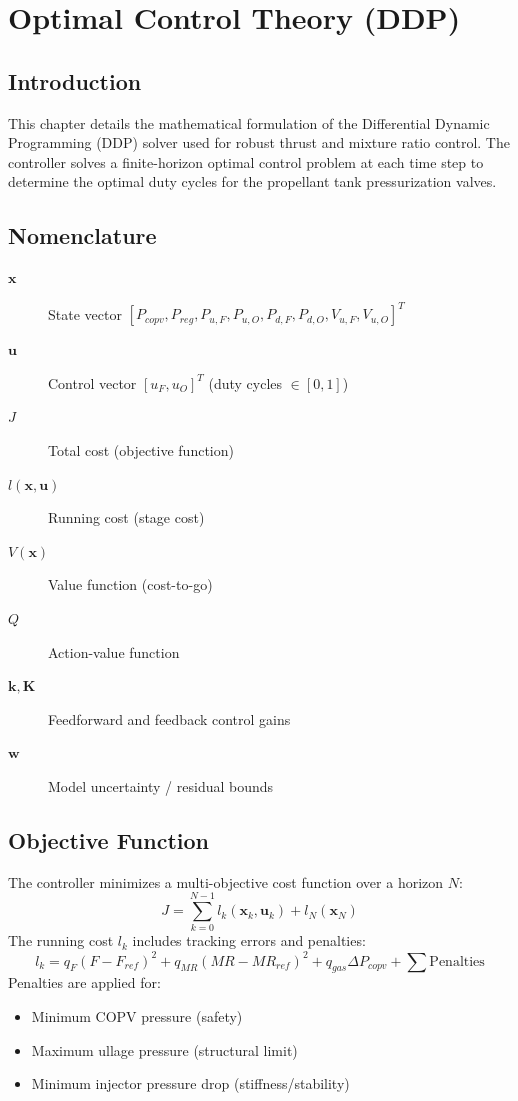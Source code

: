 \section{Optimal Control Theory (DDP)}

\subsection{Introduction}
This chapter details the mathematical formulation of the Differential Dynamic Programming (DDP) solver used for robust thrust and mixture ratio control. The controller solves a finite-horizon optimal control problem at each time step to determine the optimal duty cycles for the propellant tank pressurization valves.

\subsection{Nomenclature}
\begin{description}
    \item[\(\mathbf{x}\)] State vector \([P_{copv}, P_{reg}, P_{u,F}, P_{u,O}, P_{d,F}, P_{d,O}, V_{u,F}, V_{u,O}]^T\)
    \item[\(\mathbf{u}\)] Control vector \([u_F, u_O]^T\) (duty cycles \(\in [0, 1]\))
    \item[\(J\)] Total cost (objective function)
    \item[\(l(\mathbf{x}, \mathbf{u})\)] Running cost (stage cost)
    \item[\(V(\mathbf{x})\)] Value function (cost-to-go)
    \item[\(Q\)] Action-value function
    \item[\(\mathbf{k}, \mathbf{K}\)] Feedforward and feedback control gains
    \item[\(\mathbf{w}\)] Model uncertainty / residual bounds
\end{description}

\subsection{Objective Function}
The controller minimizes a multi-objective cost function over a horizon \(N\):
\begin{equation}
J = \sum_{k=0}^{N-1} l_k(\mathbf{x}_k, \mathbf{u}_k) + l_N(\mathbf{x}_N)
\end{equation}
The running cost \(l_k\) includes tracking errors and penalties:
\begin{equation}
l_k = q_F(F - F_{ref})^2 + q_{MR}(MR - MR_{ref})^2 + q_{gas}\Delta P_{copv} + \sum \text{Penalties}
\end{equation}
Penalties are applied for:
\begin{itemize}
    \item Minimum COPV pressure (safety)
    \item Maximum ullage pressure (structural limit)
    \item Minimum injector pressure drop (stiffness/stability)
\end{itemize}

